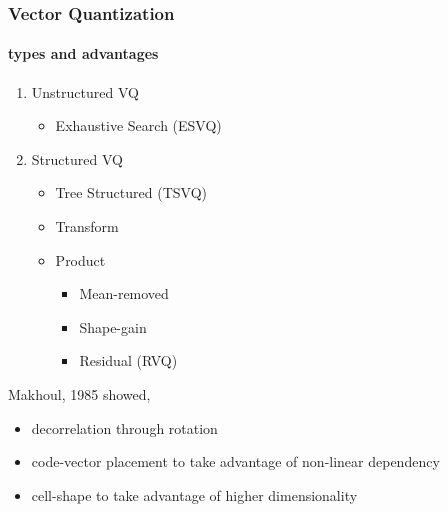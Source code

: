 \begin{frame}
\frametitle{Vector Quantization}
\framesubtitle{types and advantages}
\logoCSIPCPL\mypagenum
	\begin{enumerate}
		\item Unstructured VQ
			\begin{itemize}
				\item Exhaustive Search (ESVQ)
			\end{itemize}
		\item Structured VQ
		\begin{itemize}
			\item Tree Structured (TSVQ)
			\item Transform
			\item Product
				\begin{itemize}
					\item Mean-removed
					\item Shape-gain
					\item Residual (RVQ)
				\end{itemize}
		\end{itemize}
	\end{enumerate}
	\vspace{0.2in}
	Makhoul, 1985 showed,
	\begin{itemize}
	\item decorrelation through rotation
	\item code-vector placement to take advantage of non-linear dependency
	\item cell-shape to take advantage of higher dimensionality
	\end{itemize}
\end{frame}


